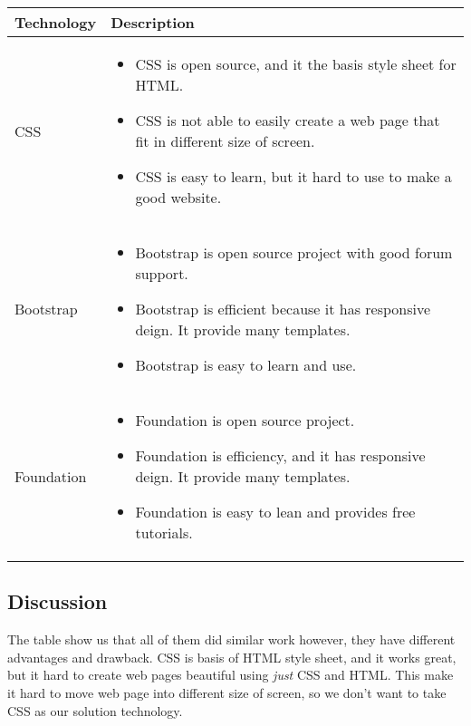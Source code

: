\begin{center}
    \begin{tabular}{ | l | p{10cm} |}
    \hline
    Technology & Description  \\ \hline
    CSS \cite{CSS_intro}&
    \begin{itemize}
      \item CSS is open source, and it the basis style sheet for HTML.
      \item CSS is not able to easily create a web page that fit in different size of screen.
      \item CSS is easy to learn, but it hard to use to make a good website.
    \end{itemize}\\ \hline
    Bootstrap \cite{boot_intro}&
    \begin{itemize}
      \item Bootstrap is open source project with good forum support.
      \item Bootstrap is efficient because it has responsive deign. It provide many templates.
      \item Bootstrap is easy to learn and use.
    \end{itemize}\\ \hline
    Foundation \cite{foundation_intro}&
    \begin{itemize}
      \item Foundation is open source project.
      \item Foundation is efficiency, and it has responsive deign. It provide many templates.
      \item Foundation is easy to lean and provides free tutorials.
    \end{itemize}\\ \hline
    \end{tabular}
\end{center}

\subsection{Discussion}

The table show us that all of them did similar work however, they have different advantages and drawback.
CSS is basis of HTML style sheet, and it works great, but it hard to create web pages beautiful using \textit{just} CSS and HTML.
This make it hard to move web page into different size of screen, so we don't want to take CSS as our solution technology.

